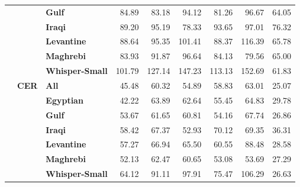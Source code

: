 \begin{table}
\begin{tabular}{lllrrrrrr}
\textbf{} & \textbf{} & \textbf{Gulf} & 84.89 & 83.18 & 94.12 & 81.26 & 96.67 & 64.05 \\
\textbf{} & \textbf{} & \textbf{Iraqi} & 89.20 & 95.19 & 78.33 & 93.65 & 97.01 & 76.32 \\
\textbf{} & \textbf{} & \textbf{Levantine} & 88.64 & 95.35 & 101.41 & 88.37 & 116.39 & 65.78 \\
\textbf{} & \textbf{} & \textbf{Maghrebi} & 83.93 & 91.87 & 96.64 & 84.13 & 79.56 & 65.00 \\
\textbf{} & \textbf{} & \textbf{Whisper-Small} & 101.79 & 127.14 & 147.23 & 113.13 & 152.69 & 61.83 \\
\cline{2-9}
\textbf{} & \multirow[t]{7}{*}{\textbf{CER}} & \textbf{All} & 45.48 & 60.32 & 54.89 & 58.83 & 63.01 & 25.07 \\
\textbf{} & \textbf{} & \textbf{Egyptian} & 42.22 & 63.89 & 62.64 & 55.45 & 64.83 & 29.78 \\
\textbf{} & \textbf{} & \textbf{Gulf} & 53.67 & 61.65 & 60.81 & 54.16 & 67.74 & 26.86 \\
\textbf{} & \textbf{} & \textbf{Iraqi} & 58.42 & 67.37 & 52.93 & 70.12 & 69.35 & 36.31 \\
\textbf{} & \textbf{} & \textbf{Levantine} & 57.27 & 66.94 & 65.50 & 60.55 & 88.48 & 28.58 \\
\textbf{} & \textbf{} & \textbf{Maghrebi} & 52.13 & 62.47 & 60.65 & 53.08 & 53.69 & 27.29 \\
\textbf{} & \textbf{} & \textbf{Whisper-Small} & 64.12 & 91.11 & 97.91 & 75.47 & 106.29 & 26.63 \\
\cline{1-9} \cline{2-9}
\bottomrule
\end{tabular}
\end{table}
